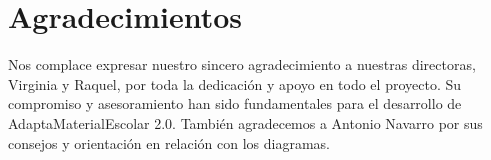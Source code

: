 
\chapter*{Agradecimientos}
Nos complace expresar nuestro sincero agradecimiento a nuestras directoras, Virginia y Raquel, por toda la dedicación y apoyo en todo el proyecto. Su compromiso y asesoramiento han sido fundamentales para el desarrollo de AdaptaMaterialEscolar 2.0. También agradecemos a Antonio Navarro por sus consejos y orientación en relación con los diagramas.










